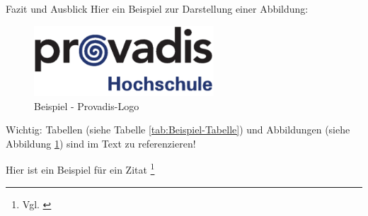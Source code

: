 \begin{section}{Fazit und Ausblick}
Hier ein Beispiel zur Darstellung einer Abbildung:

\begin{figure}[h]
\centering
\includegraphics[width=0.6\textwidth]{figures/image1.png}
\caption{Beispiel - Provadis-Logo}
\label{fig:provadis-logo}
\end{figure}

Wichtig: Tabellen (siehe Tabelle \ref{tab:Beispiel-Tabelle}) und Abbildungen (siehe Abbildung \ref{fig:provadis-logo}) sind im Text zu referenzieren!

Hier ist ein Beispiel für ein Zitat \footnote{ Vgl. \cite{platzhalter}}

\end{section}
